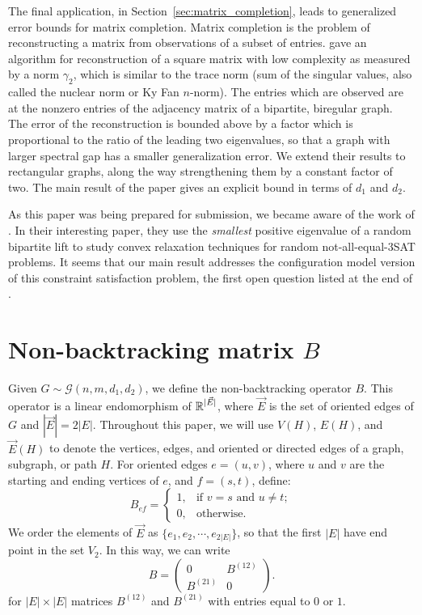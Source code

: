 The final application, in Section~\ref{sec:matrix_completion},
leads to generalized error bounds for matrix completion.
Matrix completion is the problem of reconstructing a matrix from
observations of a subset of entries.
\citet*{heiman2014} gave an algorithm for reconstruction of a
square matrix with low complexity as measured by
a norm $\gamma_2$, which is similar to the trace norm
(sum of the singular values,
also called the nuclear norm or Ky Fan $n$-norm).
The entries which are observed are at the nonzero entries 
of the adjacency matrix of a bipartite, biregular graph. 
The error of the reconstruction is bounded above by a factor which is proportional
to the ratio of the leading two eigenvalues, so that a graph with larger
spectral gap has a smaller generalization error.
We extend their results to rectangular graphs, 
along the way strengthening them by a constant factor of two. 
The main result of the paper gives an explicit bound in terms of $d_1$ and $d_2$.

As this paper was being prepared for submission, 
we became aware of the work of \citet*{deshpande2018}.
In their interesting paper, they use the {\it smallest} positive eigenvalue 
of a random bipartite lift to study convex relaxation techniques for random
not-all-equal-3SAT problems.
It seems that our main result addresses the
configuration model version of this constraint satisfaction problem,
the first open question listed at the end of \citet*{deshpande2018}.

\section{Non-backtracking matrix $B$}\label{sec2:B}

\label{sec:non_backtracking_matrix}

Given $G \sim \mathcal{G}(n,m,d_1,d_2)$, 
we define the non-backtracking operator $B$.
This operator is a linear endomorphism of $\operatorname{\mathbb{R}}^{|\vec{E}|}$,
where $\vec{E}$ is the set of oriented edges of $G$ and $|\vec{E}| = 2|E|$.
Throughout this paper, we will use $V(H)$, $E(H)$, and $\vec{E}(H)$
to denote the vertices, edges, and oriented or directed edges
of a graph, subgraph, or path $H$.
For oriented edges $e=(u,v)$,
where $u$ and $v$ are the starting and ending vertices of $e$,
and $f=(s,t)$, define:
 \[
B_{ef}=
\begin{cases}
  1,&\textrm{if $v=s$ and $u\neq t$};\\
  0,& \textrm{otherwise}.
\end{cases}
\]
We order the elements of $\vec{E}$ as $\{e_1, e_2,\cdots,e_{2|E|}\}$, so that the first $|E|$ have end point in the set $V_2$. In this way, we can write
\[
B = 
\left(
\begin{array}{cc} 
0 & B^{(12)} \\
B^{(21)} & 0 
\end{array} 
\right) .
\]
for $|E| \times |E|$ matrices 
$B^{(12)}$ and $B^{(21)}$ with entries equal to $0$ or $1$.

